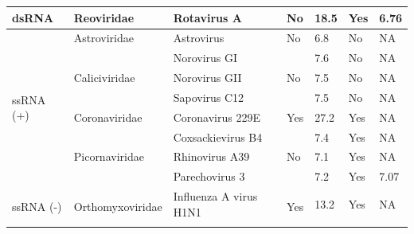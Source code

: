 \begin{center}
\begin{landscape}
\begin{table}[]
{\begin{tabular}{|l|l|l|l|l|l|l|}
dsRNA                      & Reoviridae                        & Rotavirus A                    & No                   & 18.5        & Yes                  & 6.76                                         \\ \hline
\multirow{8}{*}{ssRNA (+)} & Astroviridae                      & Astrovirus                     & No                   & 6.8         & No                   & NA                                           \\ \cline{2-7} 
                           & \multirow{3}{*}{Caliciviridae}    & Norovirus GI                   & \multirow{3}{*}{No}  & 7.6         & No                   & NA                                           \\ \cline{3-3} \cline{5-7} 
                           &                                   & Norovirus GII                  &                      & 7.5         & No                   & NA                                           \\ \cline{3-3} \cline{5-7} 
                           &                                   & Sapovirus C12                  &                      & 7.5         & No                   & NA                                           \\ \cline{2-7} 
                           & Coronaviridae                     & Coronavirus 229E               & Yes                  & 27.2        & Yes                  & NA                                           \\ \cline{2-7} 
                           & \multirow{3}{*}{Picornaviridae}   & Coxsackievirus B4              & \multirow{3}{*}{No}  & 7.4         & Yes                  & NA                                           \\ \cline{3-3} \cline{5-7} 
                           &                                   & Rhinovirus A39                 &                      & 7.1         & Yes                  & NA                                           \\ \cline{3-3} \cline{5-7} 
                           &                                   & Parechovirus 3                 &                      & 7.2         & Yes                  & 7.07                                         \\ \hline
\multirow{9}{*}{ssRNA (-)} & \multirow{3}{*}{Orthomyxoviridae} & Influenza A virus H1N1         & \multirow{3}{*}{Yes} & 13.2        & Yes                  & NA                                           \\ \cline{3-3} \cline{5-7} 

\end{tabular}}
\end{table}
\end{landscape}
\end{center}
